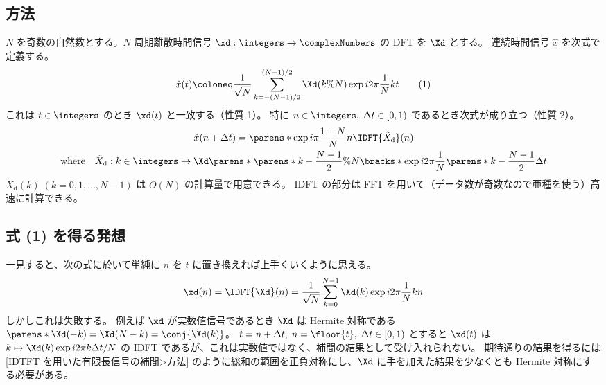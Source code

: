         \subsection{方法}
            \label{IDFT を用いた周期信号の補間>方法}
            \newcommand{\Xtilded}{\tilde{X}_\text{d}}
            $N$ を奇数の自然数とする。$N$ 周期離散時間信号 $\xd:\integers\to\complexNumbers$ の DFT を $\Xd$ とする。
            連続時間信号 $\hat{x}$ を次式で定義する。
            \[ \hat{x}(t) \coloneq \frac{1}{\sqrt{N}}\sum_{k=-(N-1)/2}^{(N-1)/2}\Xd(k\%N)\exp i2\pi\frac{1}{N}kt \tag{1} \]
            これは $t\in\integers$ のとき $\xd(t)$ と一致する（性質 1）。
            特に $n\in\integers,\;\Delta t\in[0,1)$ であるとき次式が成り立つ（性質 2）。
            \begin{gather}
                \hat{x}(n+\Delta t) = \parens*{\exp i\pi\frac{1-N}{N}n}\IDFT{\Xtilded}(n) \label{IDFT を用いた周期信号の補間>公式}\\
                \text{where} \quad \Xtilded:k\in\integers\mapsto\Xd\parens*{\parens*{k-\frac{N-1}{2}}\%N}\bracks*{\exp i2\pi\frac{1}{N}\parens*{k-\frac{N-1}{2}}\Delta t} \nonumber
            \end{gather}
            $\Xtilded(k)\;(k=0,1,\dots,N-1)$ は $O(N)$ の計算量で用意できる。
            IDFT の部分は FFT を用いて（データ数が奇数なので亜種を使う）高速に計算できる。
        \subsection{式 (1) を得る発想}
            一見すると、次の式に於いて単純に $n$ を $t$ に置き換えれば上手くいくように思える。
            \[ \xd(n) = \IDFT{\Xd}(n) = \frac{1}{\sqrt{N}}\sum_{k=0}^{N-1}\Xd(k)\exp i2\pi\frac{1}{N}kn \]
            しかしこれは失敗する。
            例えば $\xd$ が実数値信号であるとき $\Xd$ は Hermite 対称である $\parens*{\Xd(-k)=\Xd(N-k)=\conj{\Xd(k)}}$。
            $t=n+\Delta t,\;n=\floor{t},\;\Delta t\in[0,1)$ とすると $\xd(t)$ は $k\mapsto\Xd(k)\exp i2\pi k\Delta t/N$ の IDFT であるが、これは実数値ではなく、補間の結果として受け入れられない。
            期待通りの結果を得るには \ref{IDTFT を用いた有限長信号の補間>方法} のように総和の範囲を正負対称にし、$\Xd$ に手を加えた結果を少なくとも Hermite 対称にする必要がある。
